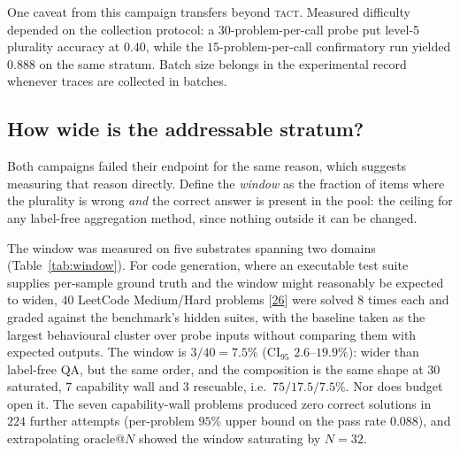 \documentclass[conference]{IEEEtran}
\newcommand{\TACT}{\textsc{tact}}
\begin{document}
One caveat from this campaign transfers beyond \TACT. Measured difficulty
depended on the collection protocol: a $30$-problem-per-call probe put
level-5 plurality accuracy at $0.40$, while the $15$-problem-per-call
confirmatory run yielded $0.888$ on the same stratum. Batch size belongs in
the experimental record whenever traces are collected in batches.

\subsection{How wide is the addressable stratum?}\label{sec:window}
Both campaigns failed their endpoint for the same reason, which suggests
measuring that reason directly. Define the \emph{window} as the fraction of
items where the plurality is wrong \emph{and} the correct answer is present
in the pool: the ceiling for any label-free aggregation method, since nothing
outside it can be changed.

The window was measured on five substrates spanning two domains
(Table~\ref{tab:window}). For code generation, where an executable test suite
supplies per-sample ground truth and the window might reasonably be expected
to widen, $40$ LeetCode Medium/Hard problems [\hyperlink{bib:leetcodedataset}{26}] were
solved $8$ times each and graded against the benchmark's hidden suites, with
the baseline taken as the largest behavioural cluster over probe inputs
without comparing them with expected outputs. The window is $3/40=7.5\%$ (CI$_{95}$
$2.6$--$19.9\%$): wider than label-free QA, but the same order, and the
composition is the same shape at $30$ saturated, $7$ capability wall and $3$
rescuable, i.e.\ $75/17.5/7.5\%$. Nor does budget open it. The seven capability-wall problems
produced zero correct solutions in $224$ further attempts (per-problem $95\%$
upper bound on the pass rate $0.088$), and extrapolating oracle@$N$ showed the
window saturating by $N{=}32$.
\end{document}
